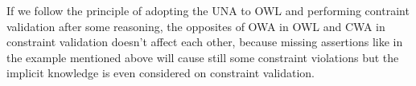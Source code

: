 \documentclass{llncs}
\newcommand{\ms}[1]{\texttt{#1}}
\begin{document}
If we follow the principle of adopting the UNA to OWL and performing contraint validation after some reasoning, the opposites of OWA in OWL and CWA in constraint validation doesn't affect each other, because missing assertions like in the example mentioned above will cause still some constraint violations but the implicit knowledge is even considered on constraint validation.

%
%


%
\end{document}

